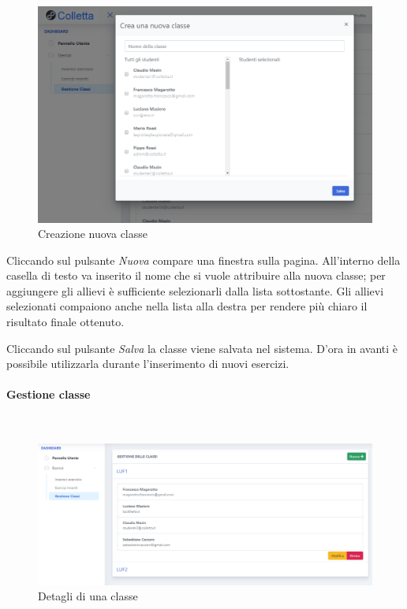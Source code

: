 \begin{figure}[H]
            	\centering
        		\includegraphics[width=17cm]{sez/img/insegnante/creanuovaclasse.PNG} 
            	\caption{Creazione nuova classe}\label{fig:1}
        	\end{figure}            	

Cliccando sul pulsante  \textit{Nuova} compare una finestra sulla pagina. All'interno della casella di testo va inserito il nome che si vuole attribuire alla nuova classe; per aggiungere gli allievi è sufficiente selezionarli dalla lista sottostante. Gli allievi selezionati compaiono anche nella lista alla destra per rendere più chiaro il risultato finale ottenuto. 

Cliccando sul pulsante \textit{Salva} la classe viene salvata nel sistema. D'ora in avanti è possibile utilizzarla durante l'inserimento di nuovi esercizi.
 
 \paragraph{Gestione classe}\mbox{}\\
 
 \begin{figure}[H]
            	\centering
        		\includegraphics[width=17cm]{sez/img/insegnante/gestioneclasse.PNG} 
            	\caption{Detagli di una classe}\label{fig:1}
        	\end{figure}
        	
